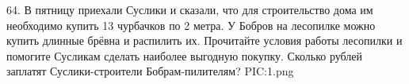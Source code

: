 64. В пятницу приехали Суслики и сказали, что для строительство дома им необходимо купить 13 чурбачков по 2 метра. У Бобров на лесопилке можно купить длинные брёвна и распилить их. Прочитайте условия работы лесопилки и помогите Сусликам сделать наиболее выгодную покупку. Сколько рублей заплатят Суслики-строители Бобрам-пилителям?
{{PIC:1.png}}\\
